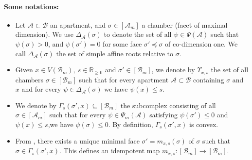 \documentclass[11 pt]{article}
\numberwithin{equation}{subsection}
\theoremstyle{definition}
\theoremstyle{remark}
\theoremstyle{conjecture}
\newcommand{\R}{\mathbb R}
\newcommand{\A}{\mathcal A}
\newcommand{\B}{\mathcal{B}}
\begin{document}
\paragraph{Some notations:} \begin{itemize}
    \item [(i)]Let $\A\subset \B$ an apartment, and $\sigma \in [\A_m]$ a chamber (facet of maximal dimension). We use $\Delta_\A(\sigma)$ to denote the set of all $\psi \in \Psi(\A)$ such that $\psi(\sigma)>0$, and $\psi(\sigma')=0$ for some face $\sigma'\preceq \sigma $ of co-dimension one. We call $\Delta_\A(\sigma)$ the set of simple affine roots relative to $\sigma$.
    \item[(ii)] Given $x \in V(\B_m),\: s \in \R_{\geq 0}$ and $\sigma' \in [\B_m]$, we denote by $\Upsilon_{x,s}$ the set of all chambers $\sigma \in [\B_m]$ such that for every apartment $\A \subset \B$ containing $\sigma$ and $x$ and for every $\psi \in \Delta_{\A}(\sigma)$ we have $\psi(x)\leq s $. 
    \item[(iii)] We denote by $\Gamma_s(\sigma',x) \subseteq [\B_m]$ the subcomplex consisting of all $\sigma \in [\A_m]$ such that for every $\psi \in \Psi_m(\A) $  satisfying $\psi(\sigma')\leq 0$ and $\psi(x)\leq s $,we have $\psi(\sigma)\leq 0$. By definition, $\Gamma_s(\sigma',x)$ is convex.
    \item[(iv)]  From \cite[Lemma 4.10]{BKV2}, there exists a unique minimal face $\sigma'=m_{x,s}(\sigma)$ of $\sigma$ such that $\sigma\in \Gamma_s(\sigma',x)$. This defines an idempotent map $m_{x,s}:[\B_m]\rightarrow[\B_m] $.
\end{itemize}
\end{document}
